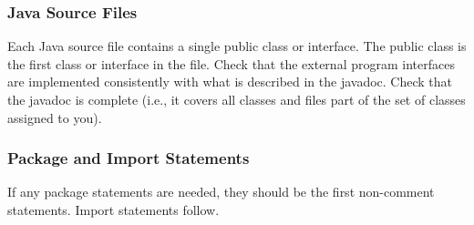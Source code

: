 \subsubsection{Java Source Files}
\begin{itemize}
		Each Java source file contains a single public class or interface.
		The public class is the first class or interface in the file.
		Check that the external program interfaces are implemented consistently with what is described in the javadoc.
		Check that the javadoc is complete (i.e., it covers all classes and files part of the set of classes assigned to you).
\end{itemize}
%
\subsubsection{Package and Import Statements}
\begin{itemize}
		If any package statements are needed, they should be the first non-comment statements. Import statements follow.
\end{itemize}
%
